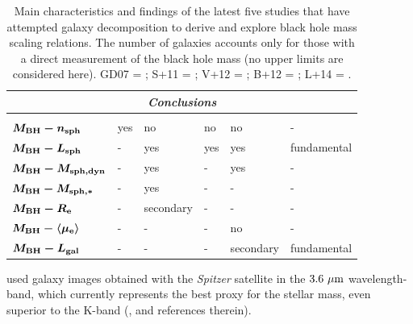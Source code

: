 \begin{table}[ht]
\begin{tabular}{llllll}
\hline
\multicolumn{6}{c}{\emph{Conclusions}} \\ 
\hline \\ [-1.5ex]
$\boldsymbol{ M_{\rm BH}-n_{\rm sph}}$  		& yes	& no	     & no  & no        & -	     \\ 	%
$\boldsymbol{ M_{\rm BH}-L_{\rm sph}}$  		& -	& yes	     & yes & yes       & fundamental \\ 	%
$\boldsymbol{ M_{\rm BH}-M_{\rm sph,dyn}}$		& -	& yes	     & -   & yes       & -	     \\ 	%
$\boldsymbol{ M_{\rm BH}-M_{\rm sph,*}}$		& -	& yes	     & -   & -         & -	     \\ 	%
$\boldsymbol{ M_{\rm BH}-R_{\rm e}}$			& -	& secondary  & -   & -         & -	     \\ 	%
$\boldsymbol{ M_{\rm BH}-\langle \mu_{\rm e} \rangle}$  & -	& -	     & -   & no        & -	     \\ 	%
$\boldsymbol{ M_{\rm BH}-L_{\rm gal}}$  		& -	& -	     & -   & secondary & fundamental \\ [0.5ex] %
\hline 
\hline 
\end{tabular}
\caption{ Main characteristics and findings of the latest five studies that have attempted galaxy decomposition 
to derive and explore black hole mass scaling relations. 
The number of galaxies accounts only for those with a direct measurement of the black hole mass 
(no upper limits are considered here). 
GD07 = \cite{grahamdriver2007}; S+11 = \cite{sani2011}; V+12 = \cite{vika2012}; B+12 = \cite{beifiori2012}; 
L+14 = \cite{lasker2014data,lasker2014anal}.}
\label{tab:lit} 
\end{table}

\cite{sani2011} used galaxy images 
obtained with the \emph{Spitzer} satellite in the $3.6~\mu \rm m$ wavelength-band, 
which currently represents the best proxy for the stellar mass, 
even superior to the K-band (\citealt{sheth2010}, and references therein). \\

